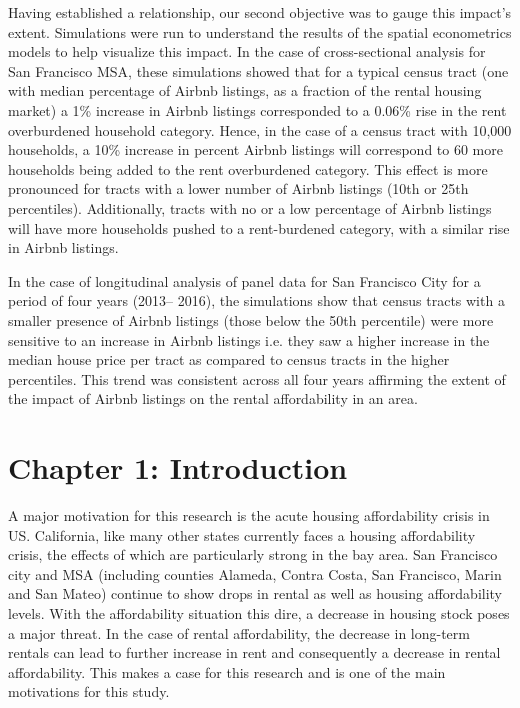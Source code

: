 \documentclass[10pt,letterpaper,onecolumn]{article}
\begin{document}
{Having established a relationship, our second objective was to gauge this impact's extent. Simulations were run to understand the results of the spatial econometrics models to help visualize this impact. In the case of cross-sectional analysis for San Francisco MSA, these simulations showed that for a typical census tract (one with median percentage of Airbnb listings, as a fraction of the rental housing market) a 1\% increase in Airbnb listings corresponded to a 0.06\% rise in the rent overburdened household category. Hence, in the case of a census tract with 10,000 households, a 10\% increase in percent Airbnb listings will correspond to 60 more households being added to the rent overburdened category.
This effect is more pronounced for tracts with a lower number of Airbnb listings (10th or 25th percentiles). Additionally, tracts with no or a low percentage of Airbnb listings will have more households pushed to a rent-burdened category, with a similar rise in Airbnb listings. 

In the case of longitudinal analysis of panel data for San Francisco City for a period of four years (2013-- 2016), the simulations show that census tracts with a smaller presence of Airbnb listings (those below the 50th percentile) were more sensitive to an increase in Airbnb listings i.e. they saw a higher increase in the median house price per tract as compared to census tracts in the higher percentiles. This trend was consistent across all four years affirming the extent of the impact of Airbnb listings on the rental affordability in an area.}


\section*{Chapter 1: Introduction}\label{sec: introduction}

A major motivation for this research is the acute housing affordability
crisis in US. California, like many other states currently faces a
housing affordability crisis, the effects of which are particularly
strong in the bay area. San Francisco city and MSA (including counties
Alameda, Contra Costa, San Francisco, Marin and San Mateo) continue to
show drops in rental as well as housing affordability levels. With the
affordability situation this dire, a decrease in housing stock poses a
major threat. In the case of rental affordability, the decrease in
long-term rentals can lead to further increase in rent and consequently
a decrease in rental affordability. This makes a case for this research
and is one of the main motivations for this study.
\end{document}
